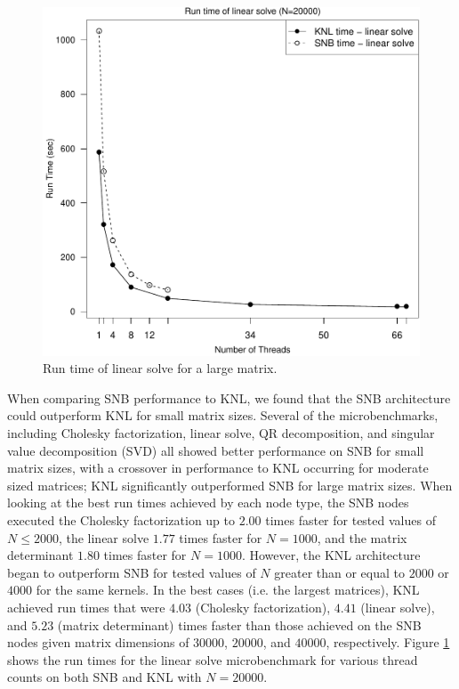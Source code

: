 \begin{figure}
\includegraphics[height=\columnwidth, width=\columnwidth]{linsolve_20000_68-rt.pdf}
\caption{Run time of linear solve for a large matrix.}
\label{fig:largeLinsolveTime}
\end{figure}

When comparing SNB performance to KNL, we found that the SNB architecture could outperform
KNL for small matrix sizes. Several of the microbenchmarks, including Cholesky
factorization, linear solve, QR decomposition, and singular value decomposition (SVD) all
showed better performance on SNB for small matrix sizes, with a crossover in performance
to KNL occurring for moderate sized matrices; KNL significantly outperformed SNB for
large matrix sizes. When looking at the best run times achieved by each node type, the SNB
nodes executed the Cholesky factorization up to $2.00$ times faster for tested values of
$N\leq 2000$, the linear solve $1.77$ times faster for $N=1000$, and the matrix determinant
$1.80$ times faster for $N=1000$.
However, the KNL architecture began to outperform SNB for tested values of $N$ greater than or
equal to $2000$ or $4000$ for the same kernels. In the best cases (i.e. the largest matrices),
KNL achieved run times that were $4.03$ (Cholesky factorization), $4.41$ (linear solve), and $5.23$ (matrix
determinant) times faster than those achieved on the SNB nodes given matrix dimensions of
$30000$, $20000$, and $40000$, respectively. Figure \ref{fig:largeLinsolveTime} shows the
run times for the linear solve microbenchmark for various thread counts on both SNB and
KNL with $N=20000$.

